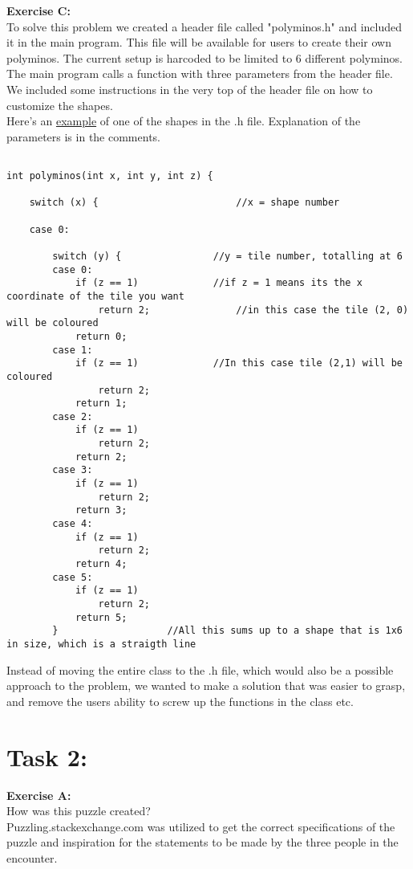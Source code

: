 \documentclass[11pt]{amsart}
\begin{document}
\textbf{Exercise C:} \\

To solve this problem we created a header file called "polyminos.h" and included it in the main program. This file will be available for users to create their own polyminos.
The current setup is harcoded to be limited to 6 different polyminos. The main program calls a function with three parameters from the header file. We included some instructions
in the very top of the header file on how to customize the shapes. \\

Here's an \underline{example} of one of the shapes in the .h file.
Explanation of the parameters is in the comments.
\begin{verbatim}

int polyminos(int x, int y, int z) {

	switch (x) {						//x = shape number

	case 0:

		switch (y) {				//y = tile number, totalling at 6
		case 0:
			if (z == 1)				//if z = 1 means its the x coordinate of the tile you want
				return 2;				//in this case the tile (2, 0) will be coloured
			return 0;
		case 1:
			if (z == 1)				//In this case tile (2,1) will be coloured
				return 2;
			return 1;
		case 2:
			if (z == 1)
				return 2;
			return 2;
		case 3:
			if (z == 1)
				return 2;
			return 3;
		case 4:
			if (z == 1)
				return 2;
			return 4;
		case 5:
			if (z == 1)
				return 2;
			return 5;
		}					//All this sums up to a shape that is 1x6 in size, which is a straigth line

		\end{verbatim}

	Instead of moving the entire class to the .h file, which would also be a possible approach to the problem, we wanted to make a solution that was easier to grasp,
	and remove the users ability to screw up the functions in the class etc.

\section{Task 2:}

\textbf{Exercise A:}\\

How was this puzzle created? \\
	Puzzling.stackexchange.com was utilized to get the correct specifications of the puzzle
	and inspiration for the statements to be made by the three people in the encounter. \\
\end{document}
